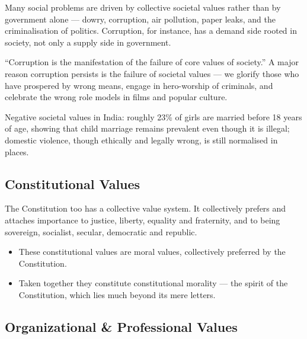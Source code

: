 Many social problems are driven by collective societal values rather than by government alone --- dowry, corruption, air pollution, paper leaks, and the criminalisation of politics. Corruption, for instance, has a demand side rooted in society, not only a supply side in government.

\begin{PYQLink}
``Corruption is the manifestation of the failure of core values of society.'' A major reason corruption persists is the failure of societal values --- we glorify those who have prospered by wrong means, engage in hero-worship of criminals, and celebrate the wrong role models in films and popular culture.
\end{PYQLink}

\begin{ExampleBox}
Negative societal values in India: roughly 23\% of girls are married before 18 years of age, showing that child marriage remains prevalent even though it is illegal; domestic violence, though ethically and legally wrong, is still normalised in places.
\end{ExampleBox}

\subsection{Constitutional Values}

The Constitution too has a collective value system. It collectively prefers and attaches importance to justice, liberty, equality and fraternity, and to being sovereign, socialist, secular, democratic and republic.

\begin{KeyConcept}
\begin{itemize}
\item These constitutional values are moral values, collectively preferred by the Constitution.
\item Taken together they constitute constitutional morality --- the spirit of the Constitution, which lies much beyond its mere letters.
\end{itemize}
\end{KeyConcept}

\subsection{Organizational \& Professional Values}

